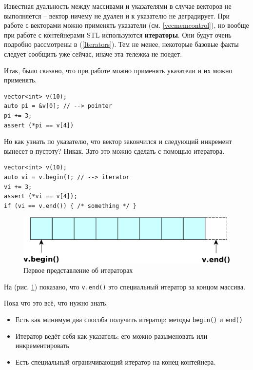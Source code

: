 \documentclass[a4paper,12pt,oneside]{article}
\begin{document}
Известная дуальность между массивами и указателями в случае векторов не выполняется -- вектор ничему не дуален и к указателю не деградирует. При работе с векторами можно применять указатели (см. \ref{vecmemcontrol}), но вообще при работе с контейнерами STL используются \textbf{итераторы}. Они будут очень подробно рассмотрены в (\ref{Iterators}). Тем не менее, некоторые базовые факты следует сообщить уже сейчас, иначе эта тележка не поедет.

Итак, было сказано, что при работе можно применять указатели и их можно применять.

\begin{lstlisting}
vector<int> v(10); 
auto pi = &v[0]; // --> pointer
pi += 3;
assert (*pi == v[4])
\end{lstlisting}

Но как узнать по указателю, что вектор закончился и следующий инкремент вынесет в пустоту? Никак. Зато это можно сделать с помощью итератора.

\begin{lstlisting}
vector<int> v(10);
auto vi = v.begin(); // --> iterator
vi += 3;
assert (*vi == v[4]);
if (vi == v.end()) { /* something */ }
\end{lstlisting}

\begin{figure}[h!]
\centering
\includegraphics[width=1.0\textwidth]{illustrations/iter-starter-crop.pdf}
\caption{Первое представление об итераторах}
\label{fig:iter_starter}
\end{figure}

На (рис. \ref{fig:iter_starter}) показано, что \lstinline!v.end()! это специальный итератор за концом массива.

Пока что это всё, что нужно знать:
\begin{itemize}
\item Есть как минимум два способа получить итератор: методы \lstinline!begin()! и \lstinline!end()!
\item Итератор ведёт себя как указатель: его можно разыменовать или инкрементировать
\item Есть специальный ограничивающий итератор на конец контейнера.
\end{itemize}
\end{document}
